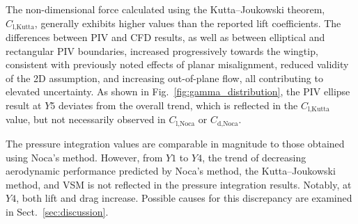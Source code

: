 \documentclass[wes, manuscript]{copernicus}
\begin{document}
The non-dimensional force calculated using the Kutta–Joukowski theorem, $C_{\textrm{l,Kutta}}$, generally exhibits higher values than the reported lift coefficients. The differences between PIV and CFD results, as well as between elliptical and rectangular PIV boundaries, increased progressively towards the wingtip, consistent with previously noted effects of planar misalignment, reduced validity of the 2D assumption, and increasing out-of-plane flow, all contributing to elevated uncertainty. As shown in Fig.~\ref{fig:gamma_distribution}, the PIV ellipse result at $Y5$ deviates from the overall trend, which is reflected in the $C_{\textrm{l,Kutta}}$ value, but not necessarily observed in $C_{\textrm{l,Noca}}$ or $C_{\textrm{d,Noca}}$.

The pressure integration values are comparable in magnitude to those obtained using Noca's method. However, from $Y1$ to $Y4$, the trend of decreasing aerodynamic performance predicted by Noca's method, the Kutta–Joukowski method, and VSM is not reflected in the pressure integration results. Notably, at $Y4$, both lift and drag increase. Possible causes for this discrepancy are examined in Sect.~\ref{sec:discussion}.
%
\end{document}
